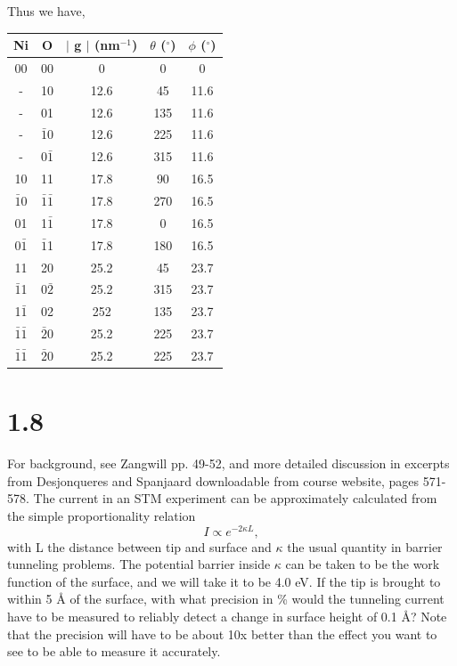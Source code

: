 \documentclass[12pt]{article}
\renewcommand{\=}[1]{\stackrel{#1}{=}} %
\theoremstyle{definition}
\theoremstyle{remark}
\begin{document}
Thus we have,
\begin{center}
 \begin{tabular}{||c c c c c||} 
 \hline
 Ni & O & $\vert$ g $\vert$ (nm$^{-1}$) & $\theta$ ($^\circ$) & $\phi$ ($^\circ$)\\ [0.5ex] 
 \hline\hline
 00 & 00 & 0 & 0 & 0 \\[1ex] 
 - & 10 & 12.6 & 45 & 11.6 \\[1ex] 
 - & 01 & 12.6 & 135 & 11.6 \\[1ex] 
 - & $\bar{1}$0 & 12.6 & 225 & 11.6 \\[1ex] 
 - & 0$\bar{1}$ & 12.6 & 315 & 11.6 \\[1ex] 
 10 & 11 & 17.8 & 90 & 16.5 \\[1ex] 
 $\bar{1}0$ & $\bar{1}\bar{1}$ & 17.8 & 270 & 16.5 \\[1ex] 
 01 & 1$\bar{1}$ & 17.8 & 0 & 16.5 \\[1ex] 
 0$\bar{1}$ & $\bar{1}$1 & 17.8 & 180 & 16.5 \\[1ex] 
 11 & 20 & 25.2 & 45 & 23.7 \\[1ex] 
 $\bar{1}$1 & 0$\bar{2}$ & 25.2 & 315 & 23.7 \\[1ex] 
 1$\bar{1}$ & 02 & 252 & 135 & 23.7 \\[1ex] 
 $\bar{1}\bar{1}$ & $\bar{2}$0 & 25.2 & 225 & 23.7 \\[1ex] 
 $\bar{1}\bar{1}$ & $\bar{2}0$ & 25.2 & 225 & 23.7 \\ [2ex] 
 \hline
\end{tabular}
\end{center}


\newpage
\section*{1.8}
\begin{bclogo}[logo=\bcquestion , barre=none]
\newline
For background, see Zangwill pp. 49-52, and more detailed discussion in excerpts from Desjonqueres and Spanjaard downloadable from course website, pages 571-578.
The current in an STM experiment can be approximately calculated from the simple proportionality relation
\[
	I \propto e^{-2\kappa L},
\]
with L the distance between tip and surface and $\kappa$ the usual quantity in barrier tunneling problems. The potential barrier inside $\kappa$ can be taken to be the work function of the surface, and we will take it to be 4.0 eV.
\vspace{2mm}
\newline
If the tip is brought to within 5 Å of the surface, with what precision in \% would the tunneling current have to be measured to reliably detect a change in surface height of 0.1 Å? Note that the precision will have to be about 10x better than the effect you want to see to be able to measure it accurately.
\end{bclogo}
\vspace{2cm}
\end{document}

